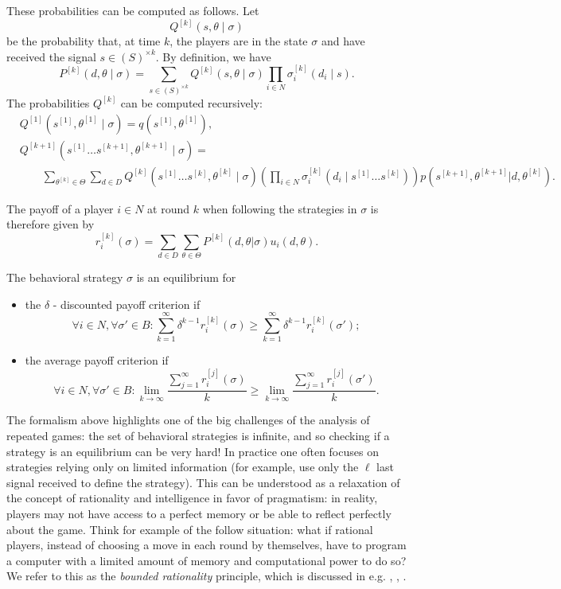 These probabilities can be computed as follows. Let
$$Q^{[k]}(s,\theta \mid \sigma) $$
be the probability that, at time $k$, the players are in the state $\sigma$ and have received the signal $s \in (S)^{\times k}$.
By definition, we have
$$ P^{[k]}(d, \theta \mid \sigma) = \sum_{s \in (S)^{\times k}} Q^{[k]}(s, \theta \mid \sigma) \prod_{i \in N} \sigma^{[k]}_i(d_i \mid s). $$
The probabilities $Q^{[k]}$ can be computed recursively:
\begin{equation*}
\begin{aligned}
& Q^{[1]}(s^{[1]}, \theta^{[1]} \mid \sigma)  = q(s^{[1]}, \theta^{[1]}), \\
& Q^{[k+1]}(s^{[1]} \ldots s^{[k+1]}, \theta^{[k+1]} \mid \sigma) =  \\
& \qquad \sum_{\theta^{[k]} \in \Theta} \sum_{d \in D} Q^{[k]}(s^{[1]} \ldots s^{[k]}, \theta^{[k]} \mid \sigma) \left( \prod_{i \in N} \sigma_i^{[k]}(d_i \mid s^{[1]} \ldots s^{[k]}) \right ) p(s^{[k+1]}, \theta^{[k+1]}|d,\theta^{[k]}).
\end{aligned}
\end{equation*}

The payoff of a player $i  \in N$ at round $k$ when following the strategies in $\sigma$ is therefore given by
$$ r_i^{[k]}(\sigma)  = \sum_{d \in D} \sum_{\theta \in \Theta} P^{[k]}(d, \theta|\sigma) u_i(d,\theta).$$

\begin{definition}[Equilibrium]
The behavioral strategy $\sigma$ is an equilibrium for
\begin{itemize}
\item the $\delta$ - discounted payoff criterion if
	$$\forall i \in N, \forall \sigma' \in B: \sum_{k = 1}^\infty \delta^{k-1} r_i^{[k]}(\sigma) \geq \sum_{k = 1}^\infty \delta^{k-1} r_i^{[k]}(\sigma');$$
\item the average payoff criterion if
	$$\forall i \in N, \forall \sigma' \in B: \lim_{k \rightarrow \infty}\frac{\sum_{j = 1}^\infty  r_i^{[j]}(\sigma)}{k} \geq \lim_{k \rightarrow \infty}\frac{\sum_{j = 1}^\infty  r_i^{[j]}(\sigma')}{k}.$$
\end{itemize}
\end{definition}

The formalism above highlights one of the big challenges of the analysis of repeated games: the set of behavioral strategies is infinite, and so checking if a strategy is an equilibrium can be very hard!
In practice one often focuses on strategies relying only on limited information (for example, use only the $\ell$ last signal received to define the strategy). This can be understood as a relaxation of the concept of rationality and intelligence in favor of pragmatism: in reality,  players may not have access to a perfect memory or be able to reflect perfectly about the game. Think for example of the follow situation: what if rational players, instead of choosing a move in each round by themselves,  have to program a computer with a limited amount of memory and computational power to do so?
We refer to this as the \emph{bounded rationality} principle, which is discussed in e.g.  \cite{RuMBR}, \cite[Section 6.1.3]{ShLeMSAG}, \cite[Chapter 9]{OsRuACIG}.


